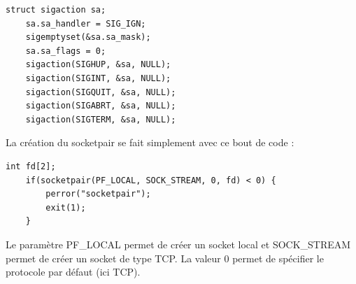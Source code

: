 \documentclass[
	a4paper, %
	10pt, %
]{CSUniSchoolLabReport}
\begin{document}
\begin{lstlisting}[style=CStyle, firstnumber=1]
	struct sigaction sa;
	sa.sa_handler = SIG_IGN;
	sigemptyset(&sa.sa_mask);
	sa.sa_flags = 0;
	sigaction(SIGHUP, &sa, NULL);
	sigaction(SIGINT, &sa, NULL);
	sigaction(SIGQUIT, &sa, NULL);
	sigaction(SIGABRT, &sa, NULL);
	sigaction(SIGTERM, &sa, NULL);
\end{lstlisting}
La création du socketpair se fait simplement avec ce bout de code :
\begin{lstlisting}[style=CStyle, firstnumber=1]
	int fd[2];
    if(socketpair(PF_LOCAL, SOCK_STREAM, 0, fd) < 0) {
        perror("socketpair");
        exit(1);
    }
\end{lstlisting}
Le param\`etre PF\_LOCAL permet de créer un socket local et SOCK\_STREAM permet de créer un socket de type TCP. La valeur 0 permet de spécifier le protocole par défaut (ici TCP).
\end{document}
